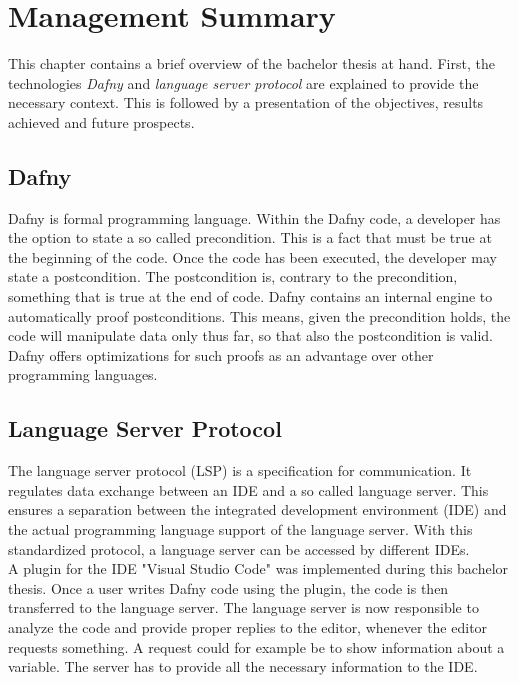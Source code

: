\section{Management Summary}
\label{section:management_summary}


This chapter contains a brief overview of the bachelor thesis at hand.
First, the technologies \textit{Dafny} and \textit{language server protocol} are explained to provide the necessary context.
This is followed by a presentation of the objectives, results achieved and future prospects.

\subsection{Dafny}
\label{section:management_summary:dafny}
Dafny is formal programming language.
Within the Dafny code, a developer has the option to state a so called precondition.
This is a fact that must be true at the beginning of the code.
Once the code has been executed, the developer may state a postcondition.
The postcondition is, contrary to the precondition, something that is true at the end of code.
Dafny contains an internal engine to automatically proof postconditions.
This means, given the precondition holds, the code will manipulate data only thus far, so that also the postcondition is valid.
Dafny offers optimizations for such proofs as an advantage over other programming languages.

\subsection{Language Server Protocol}
The language server protocol (LSP) is a specification for communication.
It regulates data exchange between an IDE and a so called language server.
This ensures a separation between the integrated development environment (IDE) and the actual programming language support of the language server.
With this standardized protocol, a language server can be accessed by different IDEs. \\

A plugin for the IDE "Visual Studio Code" was implemented during this bachelor thesis.
Once a user writes Dafny code using the plugin, the code is then transferred to the language server.
The language server is now responsible to analyze the code and provide proper replies to the editor, whenever the editor requests something.
A request could for example be to show information about a variable.
The server has to provide all the necessary information to the IDE.\\

